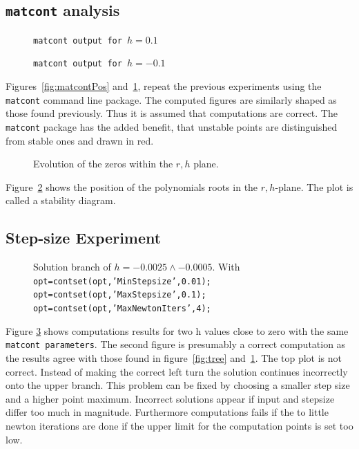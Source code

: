 \newpage
\subsection{\texttt{matcont} analysis}
\begin{figure}


\caption{\texttt{matcont output for $h=0.1$}}
\label{fig:matcontPos}


\caption{\texttt{matcont output for $h=-0.1$}}
\label{fig:matcontNeg}
\end{figure}
Figures~\ref{fig:matcontPos} and~\ref{fig:matcontNeg}, repeat the previous experiments using the \texttt{matcont} command line package. The computed figures are similarly shaped as those found previously. Thus it is assumed that computations are correct. The \texttt{matcont} package has the added benefit, that unstable points are distinguished from stable ones and drawn in red.

\begin{figure}

\caption{Evolution of the zeros within the $r,h$ plane.}
\label{fig:rh}
\end{figure}
Figure~\ref{fig:rh} shows the position of the polynomials roots in the $r,h$-plane. The plot is called a stability diagram.

\subsection{Step-size Experiment}
\begin{figure}


\caption{Solution branch of $h = -0.0025 \wedge -0.0005.$ With \texttt{ opt=contset(opt,'MinStepsize',0.01);
 opt=contset(opt,'MaxStepsize',0.1); 
 opt=contset(opt,'MaxNewtonIters',4);}}
\label{fig:lastEx}
\end{figure}
Figure \ref{fig:lastEx} shows computations results for two h values close to zero with the same \texttt{matcont parameters}. The second figure is presumably a correct computation as the results agree with those found in figure~\ref{fig:tree} and~\ref{fig:matcontNeg}. The top plot is not correct. Instead of making the correct left turn the solution continues incorrectly onto the upper branch. This problem can be fixed by choosing a smaller step size and a higher point maximum. Incorrect solutions appear if input and stepsize differ too much in magnitude. Furthermore computations fails if the to little newton iterations are done if the upper limit for the computation points is set too low.


